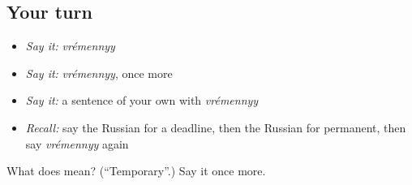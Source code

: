\subsection*{Your turn}
\begin{itemize}
\raggedright
  \item \emph{Say it:} \emph{vrémennyy}
  \item \emph{Say it:} \emph{vrémennyy}, once more
  \item \emph{Say it:} a sentence of your own with \emph{vrémennyy}
  \item \emph{Recall:} say the Russian for a deadline, then the Russian for permanent, then say \emph{vrémennyy} again
\end{itemize}

\begin{tcolorbox}[breakable,colback=teal!4,colframe=teal!35!black,title={Before you move on}]
What does  mean? (\textquotedblleft{}Temporary\textquotedblright{}.) Say it once more.
\end{tcolorbox}
